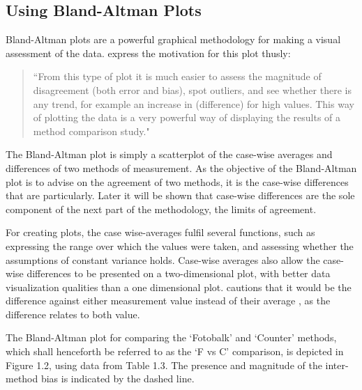 \documentclass[12pt, a4paper]{report}
\begin{document}
	
	
	
	\subsection{Using Bland-Altman Plots}
	Bland-Altman plots are a powerful graphical methodology for making
	a visual assessment of the data. \citet*{BA83} express the
	motivation for this plot thusly:
	\begin{quote}
		``From this type of plot it is much easier to assess the magnitude
		of disagreement (both error and bias), spot outliers, and see
		whether there is any trend, for example an increase in
		(difference) for high values. This way of plotting the data is a
		very powerful way of displaying the results of a method comparison
		study."
	\end{quote}
	
	The Bland-Altman plot is simply a scatterplot of the case-wise
	averages and differences of two methods of measurement. As the
	objective of the Bland-Altman plot is to advise on the agreement
	of two methods, it is the case-wise differences that are
	particularly. Later it will be shown that case-wise differences
	are the sole component of the next part of the methodology, the
	limits of agreement.
	
	For creating plots, the case wise-averages fulfil several
	functions, such as expressing the range over which the values were
	taken, and assessing whether the assumptions of constant variance
	holds. Case-wise averages also allow the case-wise differences to
	be presented on a two-dimensional plot, with better data
	visualization qualities than a one dimensional plot. \citet{BA86}
	cautions that it would be the difference against either
	measurement value instead of their average , as the difference
	relates to both value.
	
	The Bland-Altman plot for comparing the `Fotobalk' and `Counter'
	methods, which shall henceforth be referred to as the `F vs C'
	comparison,  is depicted in Figure 1.2, using data from Table 1.3.
	The presence and magnitude of the inter-method bias is indicated
	by the dashed line.
	
\end{document}
